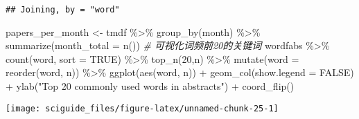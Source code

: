 \documentclass[]{tufte-book}
\newenvironment{Shaded}{}{}
\newcommand{\AttributeTok}[1]{\textcolor[rgb]{0.49,0.56,0.16}{#1}}
\newcommand{\CommentTok}[1]{\textcolor[rgb]{0.38,0.63,0.69}{\textit{#1}}}
\newcommand{\ConstantTok}[1]{\textcolor[rgb]{0.53,0.00,0.00}{#1}}
\newcommand{\DecValTok}[1]{\textcolor[rgb]{0.25,0.63,0.44}{#1}}
\newcommand{\FunctionTok}[1]{\textcolor[rgb]{0.02,0.16,0.49}{#1}}
\newcommand{\NormalTok}[1]{#1}
\newcommand{\OtherTok}[1]{\textcolor[rgb]{0.00,0.44,0.13}{#1}}
\newcommand{\SpecialCharTok}[1]{\textcolor[rgb]{0.25,0.44,0.63}{#1}}
\newcommand{\StringTok}[1]{\textcolor[rgb]{0.25,0.44,0.63}{#1}}
\begin{document}
\begin{verbatim}
## Joining, by = "word"
\end{verbatim}

\begin{Shaded}
\begin{Highlighting}[]
\NormalTok{papers\_per\_month }\OtherTok{\textless{}{-}}\NormalTok{ tmdf }\SpecialCharTok{\%\textgreater{}\%}
  \FunctionTok{group\_by}\NormalTok{(month) }\SpecialCharTok{\%\textgreater{}\%}
  \FunctionTok{summarize}\NormalTok{(}\AttributeTok{month\_total =} \FunctionTok{n}\NormalTok{())}
\CommentTok{\# 可视化词频前20的关键词}
\NormalTok{wordfabs }\SpecialCharTok{\%\textgreater{}\%}
        \FunctionTok{count}\NormalTok{(word, }\AttributeTok{sort =} \ConstantTok{TRUE}\NormalTok{) }\SpecialCharTok{\%\textgreater{}\%}
        \FunctionTok{top\_n}\NormalTok{(}\DecValTok{20}\NormalTok{,n) }\SpecialCharTok{\%\textgreater{}\%}
        \FunctionTok{mutate}\NormalTok{(}\AttributeTok{word =} \FunctionTok{reorder}\NormalTok{(word, n)) }\SpecialCharTok{\%\textgreater{}\%}
        \FunctionTok{ggplot}\NormalTok{(}\FunctionTok{aes}\NormalTok{(word, n)) }\SpecialCharTok{+}
  \FunctionTok{geom\_col}\NormalTok{(}\AttributeTok{show.legend =} \ConstantTok{FALSE}\NormalTok{) }\SpecialCharTok{+}
  \FunctionTok{ylab}\NormalTok{(}\StringTok{"Top 20 commonly used words in abstracts"}\NormalTok{) }\SpecialCharTok{+}
  \FunctionTok{coord\_flip}\NormalTok{()}
\end{Highlighting}
\end{Shaded}

\texttt{[image: sciguide\_files/figure-latex/unnamed-chunk-25-1]}
\end{document}
